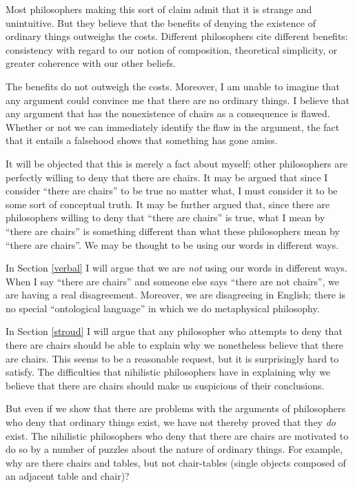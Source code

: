 \documentclass[11pt]{article}
\begin{document}
\begin{spacing}{1.5}
Most philosophers making this sort of claim admit that it is strange
and unintuitive.  But they believe that the benefits of denying the
existence of ordinary things outweighs the costs.  Different
philosophers cite different benefits: consistency with regard to our
notion of composition, theoretical simplicity, or greater coherence
with our other beliefs.

The benefits do not outweigh the costs.  Moreover, I am unable to
imagine that any argument could convince me that there are no ordinary
things.  I believe that any argument that has the nonexistence of
chairs as a consequence is flawed.  Whether or not we can immediately
identify the flaw in the argument, the fact that it entails a
falsehood shows that something has gone amiss.

It will be objected that this is merely a fact about myself; other
philosophers are perfectly willing to deny that there are chairs.  It
may be argued that since I consider ``there are chairs'' to be true no
matter what, I must consider it to be some sort of conceptual truth.
It may be further argued that, since there are philosophers willing to
deny that ``there are chairs'' is true, what I mean by ``there are
chairs'' is something different than what these philosophers mean by
``there are chairs''.  We may be thought to be using our words in
different ways.

In Section \ref{verbal} I will argue that we are {\em not} using our
words in different ways.  When I say ``there are chairs'' and someone
else says ``there are not chairs'', we are having a real disagreement.
Moreover, we are disagreeing in English; there is no special
``ontological language'' in which we do metaphysical philosophy.

In Section \ref{stroud} I will argue that any philosopher who attempts
to deny that there are chairs should be able to explain why we
nonetheless believe that there are chairs.  This seems to be a
reasonable request, but it is surprisingly hard to satisfy.  The
difficulties that nihilistic philosophers have in explaining why we
believe that there are chairs should make us suspicious of their
conclusions.

But even if we show that there are problems with the arguments of
philosophers who deny that ordinary things exist, we have not thereby
proved that they {\em do} exist.  The nihilistic philosophers who deny
that there are chairs are motivated to do so by a number of puzzles
about the nature of ordinary things.  For example, why are there
chairs and tables, but not chair-tables (single objects composed of an
adjacent table and chair)?


\end{spacing}
\end{document}
